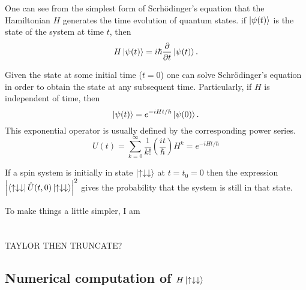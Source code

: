 \documentclass{article}
\begin{document}
One can see from the simplest form of Scrhödinger's equation that the Hamiltonian $H$ generates the time evolution of quantum states. if $\ket{\psi(t)}$ is the state of the system at time $t$, then
\begin{equation}
H\ket{\psi(t)}=i\hbar\frac{\partial}{\partial t}\ket{\psi(t)}.
\end{equation}

Given the state at some initial time ($t=0$) one can solve Schrödinger's equation in order to obtain the state at any subsequent time. Particularly, if $H$ is independent of time, then
\begin{equation}
\ket{\psi(t)}=e^{-iHt/\hbar}\ket{\psi(0)}.
\end{equation}
This exponential operator is usually defined by the corresponding power series. 
\begin{equation}
U(t) = \sum_{k=0}^{\infty}\frac{1}{k!}\left(\frac{it}{\hbar} \right)H^k = e^{-iHt/\hbar}
\end{equation}

If a spin system is initially in state $\ket{\uparrow\downarrow\downarrow}$ at $t=t_0=0$ then the expression $\abs{\bra{\uparrow\downarrow\downarrow}\hat{U}(t,0) \ket{\uparrow\downarrow\downarrow}}^2$ gives the probability that the system is still in that state.

To make things a little simpler, I am 

\section{}
TAYLOR THEN TRUNCATE?

\pagebreak
\begin{appendix}
\section{Numerical computation of $H\ket{\uparrow\downarrow\downarrow}$}
\label{app:updndn}


\end{appendix}
\end{document}
